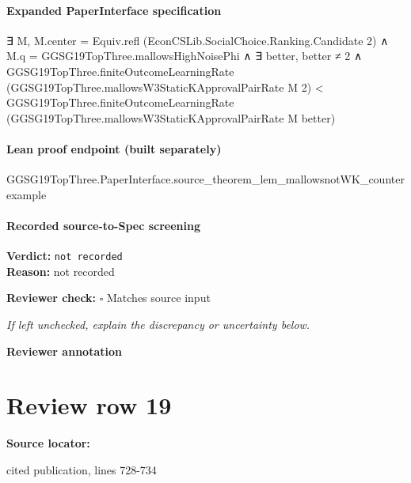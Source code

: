 \documentclass[10pt]{article}
\newcommand{\reviewerbox}{%
  \par\noindent\fbox{\parbox{0.96\linewidth}{\rule{0pt}{0.38in}}}\par
}
\newcommand{\reviewmatch}[1]{%
  \par\noindent\textbf{Reviewer check:} $\square$\; #1\par
  \noindent\emph{If left unchecked, explain the discrepancy or uncertainty below.}\par
}
\begin{document}
\paragraph{Expanded PaperInterface specification}
\begin{ReviewVerbatim}
∃ M,
  M.center = Equiv.refl (EconCSLib.SocialChoice.Ranking.Candidate 2) ∧
    M.q = GGSG19TopThree.mallowsHighNoisePhi ∧
      ∃ better,
        better ≠ 2 ∧
          GGSG19TopThree.finiteOutcomeLearningRate (GGSG19TopThree.mallowsW3StaticKApprovalPairRate M 2) <
            GGSG19TopThree.finiteOutcomeLearningRate (GGSG19TopThree.mallowsW3StaticKApprovalPairRate M better)
\end{ReviewVerbatim}

\paragraph{Lean proof endpoint (built separately)}\begin{ReviewVerbatim}
GGSG19TopThree.PaperInterface.source_theorem_lem_mallowsnotWK_counterexample
\end{ReviewVerbatim}

\paragraph{Recorded source-to-Spec screening}
\textbf{Verdict:} \texttt{not recorded}
\\
\textbf{Reason:} not recorded
\reviewmatch{Matches source input}
\noindent\textbf{Reviewer annotation}\par
\reviewerbox
\clearpage
\hypertarget{source-claim-183efad42b03de32}{}
\section*{Review row 19}
\textbf{Source locator:} {\footnotesize\raggedright cited publication, lines 728-\allowbreak{}734\par}
\end{document}
